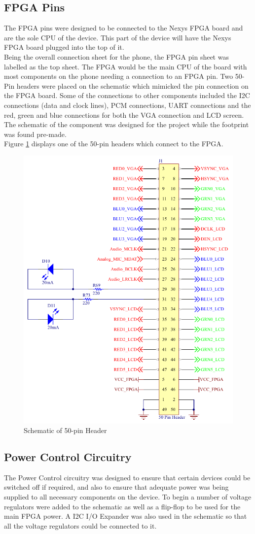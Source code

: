 \subsection{FPGA Pins}
\label{chap:FPGA}
	The FPGA pins were designed to be connected to the Nexys FPGA board and are the sole CPU of the device. 
This part of the device will have the Nexys FPGA board plugged into the top of it.\\
Being the overall connection sheet for the phone, the FPGA pin sheet was labelled as the top sheet. 
The FPGA would be the main CPU of the board with most components on the phone needing a connection to an FPGA pin. 
Two 50-Pin headers were placed on the schematic which mimicked the pin connection on the FPGA board. 
Some of the connections to other components included the I2C connections (data and clock lines), PCM connections, UART connections and the red, green and blue connections for both the VGA connection and LCD screen.\\
The schematic of the component was designed for the project while the footprint was found pre-made.\\
Figure \ref{fig:header} displays one of the 50-pin headers which connect to the FPGA.

\begin{figure}
	\includegraphics[width=0.5\linewidth]{Figures/50_pin_header.pdf}\centering
	\caption{Schematic of 50-pin Header}
	\label{fig:header}
\end{figure}

\subsection{Power Control Circuitry}
\label{chap:batt}
	The Power Control circuitry was designed to ensure that certain devices could be switched off if required, and also to ensure that adequate power was being supplied to all necessary components on the device. 
To begin a number of voltage regulators were added to the schematic as well as a flip-flop to be used for the main FPGA power. 
A I2C I/O Expander was also used in the schematic so that all the voltage regulators could be connected to it.\\

